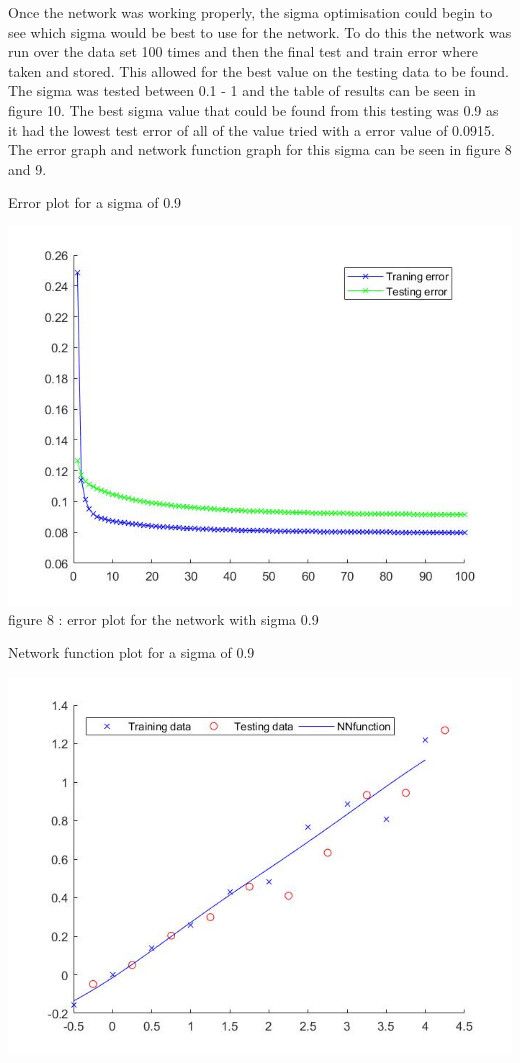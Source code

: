 \documentclass{IEEEtran}[11pt]
\begin{document}
\begin{flushleft}
  Once the network was working properly, the sigma optimisation could begin to see which sigma would be best to use for the
  network. To do this the network was run over the data set 100 times and then the final test and train error where taken and
  stored. This allowed for the best value on the testing data to be found. The sigma was tested between 0.1 - 1 and the table
  of results can be seen in figure 10. The best sigma value that could be found from this testing was 0.9 as it had the lowest
  test error of all of the value tried with a error value of 0.0915. The error graph and network function graph for this sigma
  can be seen in figure 8 and 9.
  \\
\vspace{1.5mm}
\begin{center}
  Error plot for a sigma of 0.9
\end{center}
\vspace{1.5mm}
\includegraphics[scale = 0.35]{Errorplottask1.jpg}
\vspace{1.5mm}
{\footnotesize figure 8 : error plot for the network with sigma 0.9 }
\\
\vspace{1.5mm}
\begin{center}
  Network function plot for a sigma of 0.9
\end{center}
\includegraphics[scale = 0.35]{NNfunctiontask1.jpg}

\end{flushleft}
\end{document}
